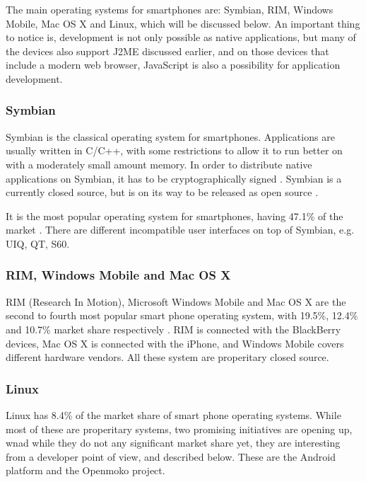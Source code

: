 \documentclass[11pt]{report}
\begin{document}
The main operating systems for smartphones are: Symbian, RIM, Windows Mobile, Mac OS X and Linux, which will be discussed below.
An important thing to notice is, development is not only possible as native applications, but many of the devices also support J2ME discussed earlier, and on those devices that include a modern web browser, JavaScript is also a possibility for application development.

\subsubsection{Symbian}

Symbian is the classical operating system for smartphones. Applications are usually written in C/C++, with some restrictions to allow it to run better on with a moderately small amount memory. 
In order to distribute native applications on Symbian, it has to be cryptographically signed \cite{symbiansigned}.
Symbian is a currently closed source, but is on its way to be released as open source \cite{symbianopensource}.

It is the most popular operating system for smartphones, having 47.1\% of the market \cite{gartner-phone-survey-2008q4}. There are different incompatible user interfaces on top of Symbian, e.g. UIQ, QT, S60. 

\subsubsection{RIM, Windows Mobile and Mac OS X}

RIM (Research In Motion), Microsoft Windows Mobile and Mac OS X are the second to fourth most popular smart phone operating system, with 19.5\%, 12.4\% and 10.7\% market share respectively \cite{gartner-phone-survey-2008q4}.
RIM is connected with the BlackBerry devices, Mac OS X is connected with the iPhone, and Windows Mobile covers different hardware vendors. 
All these system are properitary closed source.

\subsubsection{Linux}

Linux has 8.4\% of the market share of smart phone operating systems.
While most of these are properitary systems, two promising initiatives are opening up, wnad while they do not any significant market share yet, they are interesting from a developer point of view, and described below. These are the Android platform and the Openmoko project.
\end{document}
